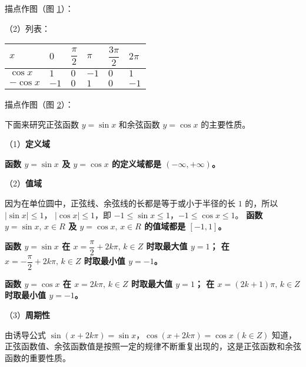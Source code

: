 描点作图（图 \ref{fig:2-21}）：

\begin{figure}[H]
    \centering
    
    \caption{}\label{fig:2-21}
\end{figure}

（2）列表：

\begin{table}[H]
\renewcommand\arraystretch{2}
\begin{tabular}{|w{c}{5em}|*{5}{w{c}{3em}|}}
    \hline
    $x$ & $0$ & $\dfrac \pi 2$ & $\pi$ & $\dfrac{3\pi}{2}$ & $2\pi$ \\ \hline
    $\cos x$ & $1$ & $0$ & $-1$ & $0$ & $1$ \\ \hline
    $-\cos x$ & $-1$ & $0$ & $1$ & $0$ & $-1$ \\ \hline
\end{tabular}
\end{table}

描点作图（图 \ref{fig:2-22}）：

\begin{figure}[H]
    \centering
    
    \caption{}\label{fig:2-22}
\end{figure}

下面来研究正弦函数 $y = \sin x$ 和余弦函数 $y = \cos x$ 的主要性质。

（1）\textbf{定义域} 

\textbf{函数 $y = \sin x$ 及 $y = \cos x$ 的定义域都是 $(-\infty, +\infty)$。}

（2）\textbf{值域} 

因为在单位圆中，正弦线、余弦线的长都是等于或小于半径的长 $1$ 的，所以 $|\sin x| \leqslant 1$，
$|\cos x| \leqslant 1$，即 $-1 \leqslant \sin x \leqslant 1$，$-1 \leqslant \cos x \leqslant 1$。
\textbf{函数 $y = \sin x, \, x\in R$ 及 $y = \cos x, \, x\in R$ 的值域都是 $[-1, 1]$。}

\textbf{函数 $y = \sin x$
在 $x = \dfrac \pi 2 + 2k\pi, \, k \in Z$ 时取最大值 $y = 1$；
在 $x = -\dfrac \pi 2 + 2k\pi, \, k \in Z$ 时取最小值 $y = -1$。}

\textbf{函数 $y = \cos x$
在 $x = 2k\pi, \, k \in Z$ 时取最大值 $y = 1$；
在 $x = (2k + 1)\pi, \, k \in Z$ 时取最小值 $y = -1$。}

（3）\textbf{周期性} 

由诱导公式 $\sin(x + 2k\pi) = \sin x$，$\cos(x + 2k\pi) = \cos x \, (k \in Z)$ 知道，
正弦函数值、余弦函数值是按照一定的规律不断重复出现的，这是正弦函数和余弦函数的重要性质。

